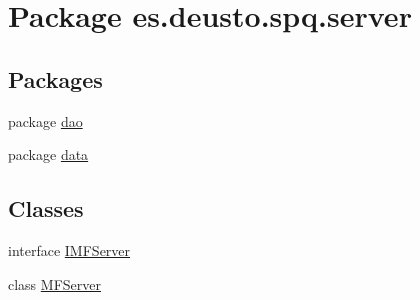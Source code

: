 \hypertarget{namespacees_1_1deusto_1_1spq_1_1server}{}\section{Package es.\+deusto.\+spq.\+server}
\label{namespacees_1_1deusto_1_1spq_1_1server}
\subsection*{Packages}
\begin{DoxyCompactItemize}
\item 
package \hyperlink{namespacees_1_1deusto_1_1spq_1_1server_1_1dao}{dao}
\item 
package \hyperlink{namespacees_1_1deusto_1_1spq_1_1server_1_1data}{data}
\end{DoxyCompactItemize}
\subsection*{Classes}
\begin{DoxyCompactItemize}
\item 
interface \hyperlink{interfacees_1_1deusto_1_1spq_1_1server_1_1_i_m_f_server}{I\+M\+F\+Server}
\item 
class \hyperlink{classes_1_1deusto_1_1spq_1_1server_1_1_m_f_server}{M\+F\+Server}
\end{DoxyCompactItemize}
